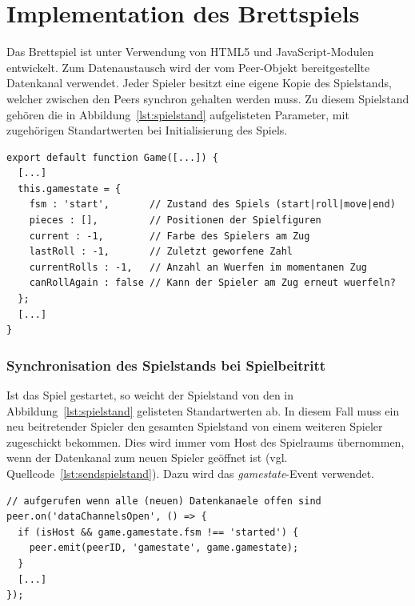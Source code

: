 \section{Implementation des Brettspiels}
Das Brettspiel ist unter Verwendung von \acs{HTML}5 und JavaScript-Modulen entwickelt. Zum Datenaustausch wird der vom Peer-Objekt bereitgestellte Datenkanal verwendet. Jeder Spieler besitzt eine eigene Kopie des Spielstands, welcher zwischen den Peers synchron gehalten werden muss. Zu diesem Spielstand gehören die in Abbildung~\ref{lst:spielstand} aufgelisteten Parameter, mit zugehörigen Standartwerten bei Initialisierung des Spiels.

\vspace{5pt}
\lstset{language=js, style=STYLE_CODE_JS}
\begin{minipage}{\textwidth}
\begin{singlespace}
\begin{lstlisting}[caption={Spielstandsdaten -- Game.js}, captionpos=b, label={lst:spielstand}]
export default function Game([...]) {
  [...]
  this.gamestate = {
    fsm : 'start',       // Zustand des Spiels (start|roll|move|end)
    pieces : [],         // Positionen der Spielfiguren
    current : -1,        // Farbe des Spielers am Zug
    lastRoll : -1,       // Zuletzt geworfene Zahl
    currentRolls : -1,   // Anzahl an Wuerfen im momentanen Zug
    canRollAgain : false // Kann der Spieler am Zug erneut wuerfeln?
  };
  [...]
}
\end{lstlisting}
\end{singlespace}
\end{minipage}

\subsubsection{Synchronisation des Spielstands bei Spielbeitritt}
Ist das Spiel gestartet, so weicht der Spielstand von den in Abbildung~\ref{lst:spielstand} gelisteten Standartwerten ab. In diesem Fall muss ein neu beitretender Spieler den gesamten Spielstand von einem weiteren Spieler zugeschickt bekommen. Dies wird immer vom Host des Spielraums übernommen, wenn der Datenkanal zum neuen Spieler geöffnet ist (vgl. Quellcode~\ref{lst:sendspielstand}). Dazu wird das \textit{gamestate}-Event verwendet.

\vspace{5pt}
\lstset{language=js, style=STYLE_CODE_JS}
\begin{minipage}{\textwidth}
\begin{singlespace}
\begin{lstlisting}[caption={Senden des Spielstands -- game.js}, captionpos=b, label={lst:sendspielstand}]
// aufgerufen wenn alle (neuen) Datenkanaele offen sind
peer.on('dataChannelsOpen', () => {
  if (isHost && game.gamestate.fsm !== 'started') {
    peer.emit(peerID, 'gamestate', game.gamestate);
  }
  [...]
});
\end{lstlisting}
\end{singlespace}
\end{minipage}


